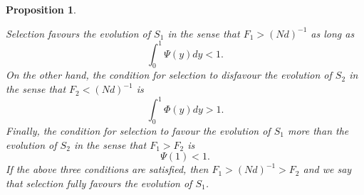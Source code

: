 \documentclass[11pt]{article}
\newtheorem{Proposition}{Proposition}
\begin{document}
\begin{Proposition}\label{Proposition9}

Selection favours the evolution of $S_1$ in the sense that  $F_{1}>(Nd)^{-1}$ as long as 
\begin{equation}\label{sec4-eq9}
\int_{0}^{1}\Psi(y)dy<1.
\end{equation} 
On the other hand, the condition for selection to disfavour the evolution of $S_2$ in the sense that $F_{2}<(Nd)^{-1}$ is
\begin{equation}\label{sec4-eq10}
\int_{0}^{1}\Phi(y)dy>1.
\end{equation}  
Finally, the condition for selection to favour the evolution of $S_1$ more than the evolution of $S_2$ in the sense that $F_1>F_2$ is
\begin{equation}\label{sec4-eq11}
\Psi(1)<1.
\end{equation}  
If the above three conditions are satisfied, then $F_1>(Nd)^{-1}>F_2$ and we say that selection fully favours the evolution of $S_1$.
\end{Proposition}



\end{document}
